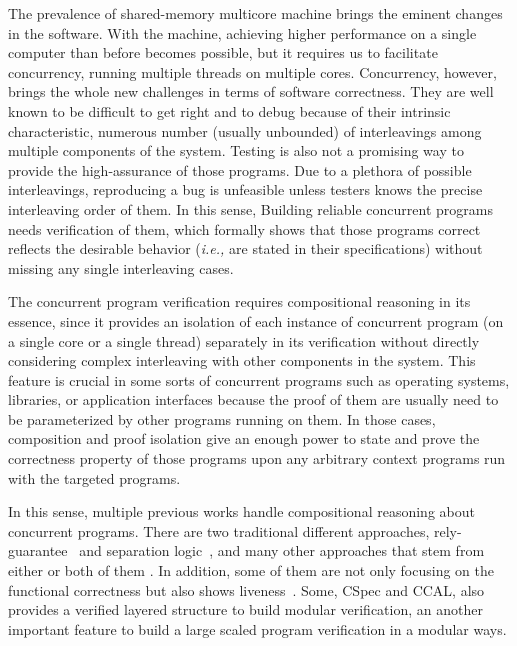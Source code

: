 The prevalence of shared-memory multicore machine 
brings the eminent changes in the  software. 
With the machine, achieving higher performance on a single computer than before 
becomes possible, 
but it requires us to facilitate 
concurrency, running multiple threads on multiple cores.
Concurrency, however, 
brings the whole new challenges in terms of software correctness. 
They are well known 
to be difficult to get right and to debug because 
of their intrinsic characteristic, numerous number (usually unbounded) of interleavings among multiple components of the system. 
Testing is also not a promising way to provide the high-assurance of those programs. 
Due to a plethora of possible interleavings, 
reproducing a bug is unfeasible unless testers knows the 
precise interleaving order of them. 
In this sense, 
Building reliable concurrent programs 
needs verification of them, which formally shows that those programs correct reflects the 
desirable behavior (\textit{i.e.,} are stated in their specifications) 
without missing any single interleaving cases. 

The concurrent program verification requires compositional reasoning in its essence,
since it provides an isolation of each instance of concurrent program
(on a single core or a single thread) separately  
 in its verification
without directly considering complex interleaving 
with other components in the system. 
This feature is crucial in some sorts 
of concurrent programs such as 
operating systems, libraries, or application interfaces
because the
proof of them 
are usually need to be parameterized by 
other programs running on them. 
In those cases, composition and proof isolation 
give  an enough power 
to state and prove the correctness property 
of those programs upon any arbitrary context programs run with the targeted programs. 


In this sense, 
multiple previous works handle compositional reasoning about concurrent programs.
There are two traditional different approaches,
rely-guarantee~ and separation logic~,
and many other approaches that stem from either or both of them
.
In addition, some of them are not only focusing on the functional correctness but also 
shows liveness~. 
Some, CSpec and CCAL, also provides a verified layered structure to build modular verification, an another important 
feature to build a large scaled program verification in a modular ways.


